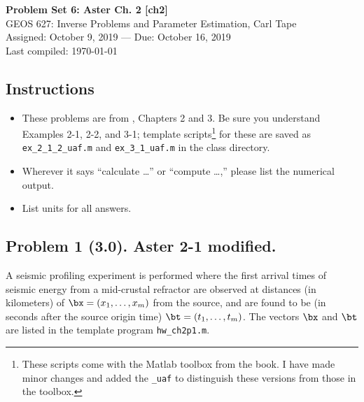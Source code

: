 \documentclass[11pt,titlepage,fleqn]{article}
\begin{document}

\begin{spacing}{1.2}
\centering
{\large \bf Problem Set 6: Aster Ch. 2 [ch2]} \\
GEOS 627: Inverse Problems and Parameter Estimation, Carl Tape \\
Assigned: October 9, 2019 --- Due: October 16, 2019 \\
Last compiled: \today
\end{spacing}


\subsection*{Instructions}

\begin{itemize}
\item These problems are from \citet{Aster}, Chapters 2 and 3. Be sure you understand Examples 2-1, 2-2, and 3-1; template scripts\footnote{These scripts come with the Matlab toolbox from the book. I have made minor changes and added the {\tt \_uaf} to distinguish these versions from those in the toolbox.}  for these are saved as \verb+ex_2_1_2_uaf.m+ and \verb+ex_3_1_uaf.m+ in the class directory.
\item Wherever it says ``calculate \ldots'' or ``compute \ldots,'' please list the numerical output.
\item List units for all answers.
\end{itemize}

\subsection*{Problem 1 (3.0). Aster 2-1 modified.}

A seismic profiling experiment is performed where the first arrival times of seismic energy from a mid-crustal refractor are observed at distances (in kilometers) of $\bx = (x_1, \ldots, x_m)$ from the source, and are found to be (in seconds after the source origin time) $\bt = (t_1, \ldots, t_m)$. The vectors $\bx$ and $\bt$ are listed in the template program \verb+hw_ch2p1.m+.
\end{document}

